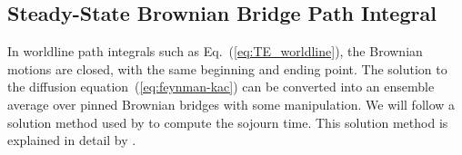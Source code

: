 \subsection{Steady-State Brownian Bridge Path Integral}

In worldline path integrals such as Eq.~(\ref{eq:TE_worldline}), 
the Brownian motions are closed, with the same beginning and ending point.  
The solution to the diffusion equation~(\ref{eq:feynman-kac}) can be converted into an 
ensemble average over pinned Brownian bridges  with some manipulation.
We will follow a solution method used by \citet{Hooghiemstra2002} to compute the sojourn time.  
This solution method is explained in detail by \citet[\S 17.9 -- \S 17.11]{SteckNotes}.

